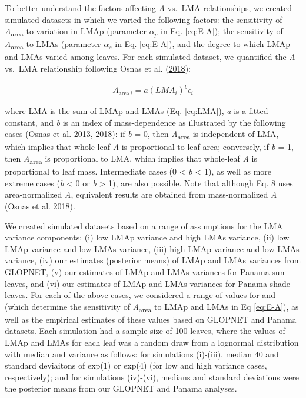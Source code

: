\documentclass[
  12pt,
  a4paper,
,tablecaptionabove
]{scrartcl}
\begin{document}
To better understand the factors affecting \emph{A} vs.~LMA relationships, we created simulated datasets in which we varied the following factors: the sensitivity of \emph{A}\textsubscript{area} to variation in LMAp (parameter \(\alpha_p\) in Eq. \eqref{eq:E-A}); the sensitivity of \emph{A}\textsubscript{area} to LMAs (parameter \(\alpha_s\) in Eq. \eqref{eq:E-A}), and the degree to which LMAp and LMAs varied among leaves.
For each simulated dataset, we quantified the \emph{A} vs.~LMA relationship following Osnas et al. (\protect\hyperlink{ref-Osnas2018}{2018}):

\begin{align}
A_{\mathrm{area} \, i} = a (LMA_i)^{b}\epsilon_i \tag{8}
\end{align}

where LMA is the sum of LMAp and LMAs (Eq. \eqref{eq:LMA}), \emph{a} is a fitted constant, and \emph{b} is an index of mass-dependence as illustrated by the following cases (\protect\hyperlink{ref-Osnas2013}{Osnas et al. 2013}, \protect\hyperlink{ref-Osnas2018}{2018}): if \emph{b} = 0, then \emph{A}\textsubscript{area} is independent of LMA, which implies that whole-leaf \emph{A} is proportional to leaf area; conversely, if \emph{b} = 1, then \emph{A}\textsubscript{area} is proportional to LMA, which implies that whole-leaf \emph{A} is proportional to leaf mass.
Intermediate cases (0 \textless{} \emph{b} \textless{} 1), as well as more extreme cases (\emph{b} \textless{} 0 or \emph{b} \textgreater{} 1), are also possible.
Note that although Eq. 8 uses area-normalized \emph{A}, equivalent results are obtained from mass-normalized \emph{A} (\protect\hyperlink{ref-Osnas2018}{Osnas et al. 2018}).

We created simulated datasets based on a range of assumptions for the LMA variance components: (i) low LMAp variance and high LMAs variance, (ii) low LMAp variance and low LMAs variance, (iii) high LMAp variance and low LMAs variance, (iv) our estimates (posterior means) of LMAp and LMAs variances from GLOPNET, (v) our estimates of LMAp and LMAs variances for Panama sun leaves, and (vi) our estimates of LMAp and LMAs variances for Panama shade leaves.
For each of the above cases, we considered a range of values for and (which determine the sensitivity of \emph{A}\textsubscript{area} to LMAp and LMAs in Eq \eqref{eq:E-A}), as well as the empirical estimates of these values based on GLOPNET and Panama datasets.
Each simulation had a sample size of 100 leaves, where the values of LMAp and LMAs for each leaf was a random draw from a lognormal distribution with median and variance as follows: for simulations (i)-(iii), median 40 and standard deviaitons of exp(1) or exp(4) (for low and high variance cases, respectively); and for simulations (iv)-(vi), medians and standard deviations were the posterior means from our GLOPNET and Panama analyses.
\end{document}
